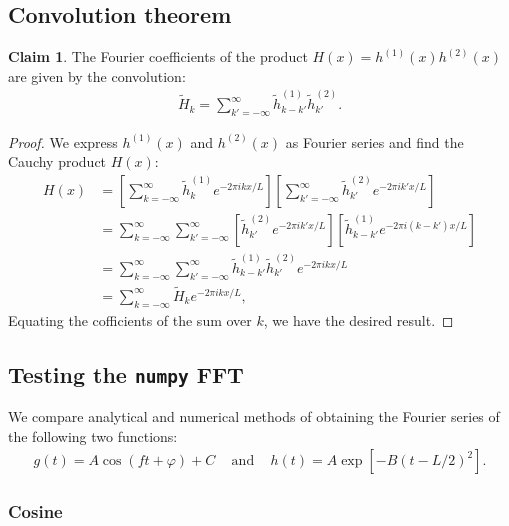 \documentclass{article}
\theoremstyle{definition}
\newtheorem*{claim}{Claim}
\renewcommand{\sp}[1]{\;\;\;\text{ #1 }\;\;\;}
\begin{document}
\subsection{Convolution theorem}

\begin{claim}
The Fourier coefficients of the product $H(x) = h^{(1)}(x) h^{(2)}(x)$
are given by the convolution:
\begin{align*}
\tilde H_k = \sum_{k' = -\infty}^\infty \tilde h^{(1)}_{k-k'}
\tilde h^{(2)}_{k'}.
\end{align*}
\end{claim}
\begin{proof}
We express $h^{(1)}(x)$
and $h^{(2)}(x)$ as Fourier series and find the Cauchy product $H(x)$:
\begin{align*}
H(x) &= 
\left[
\sum_{k = -\infty}^\infty \tilde h^{(1)}_{k} e^{-2\pi ikx/L}
\right]
\left[
\sum_{k' = -\infty}^\infty \tilde h^{(2)}_{k'} e^{-2\pi ik'x/L}
\right]
\\&=
\sum_{k = -\infty}^\infty \sum_{k' = -\infty}^\infty
\left[ \tilde h^{(2)}_{k'} e^{-2\pi ik' x/L} \right]
\left[ \tilde h^{(1)}_{k - k'} e^{-2\pi i(k - k') x/L} \right]
\\&=
\sum_{k = -\infty}^\infty \sum_{k' = -\infty}^\infty \tilde
h^{(1)}_{k - k'}
\tilde h^{(2)}_{k'} e^{-2\pi i k x/L}
\\&=
\sum_{k = -\infty}^\infty \tilde H_k e^{-2\pi i k x/L},
\end{align*}
Equating the cofficients of the sum over $k$, we have the desired
result.
\end{proof}

\subsection{Testing the \texttt{numpy} FFT}

We compare analytical and numerical methods of obtaining the Fourier
series of the following two functions:
\begin{align*}
g(t) = A \cos (ft + \varphi) + C \sp{and}
h(t) = A \exp [-B (t - L/2)^2 ].
\end{align*}

\subsubsection{Cosine}
\end{document}
